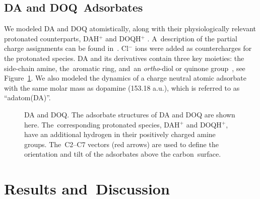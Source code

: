 \documentclass[molecules,article,accept,pdftex,moreauthors]{Definitions/mdpi}
\begin{document}
\subsection{DA and DOQ~Adsorbates}

We modeled DA and DOQ atomistically, along with their physiologically relevant protonated counterparts, DAH$^+$ and DOQH$^+$ \cite{Nishihira1997}. A~description of the partial charge assignments can be found in~\cite{Jia2022}. Cl$^-$ ions were added as countercharges for the protonated species. DA and its derivatives contain three key moieties: the side-chain amine, the~aromatic ring, and~an \textit{ortho}-diol or quinone group~\cite{Meiser2013}, see Figure~\ref{fig:Methods_model_adsorbates_moieties}. We also modeled the dynamics of a charge neutral atomic adsorbate with the same molar mass as dopamine (153.18 a.u.), which is referred to as ``adatom(DA)''.

\begin{figure}[H]
{\captionsetup{position=bottom,justification=centering}
}
    \caption{DA and DOQ. The adsorbate structures of DA and DOQ are shown here. The~corresponding protonated species, DAH$^+$ and DOQH$^+$, have an additional hydrogen in their positively charged amine groups. The~C2--C7 vectors (red arrows) are used to define the orientation and tilt of the adsorbates above the carbon~surface.}
    \label{fig:Methods_model_adsorbates_moieties}
\end{figure}

\section{Results and~Discussion}
 
\end{document}
